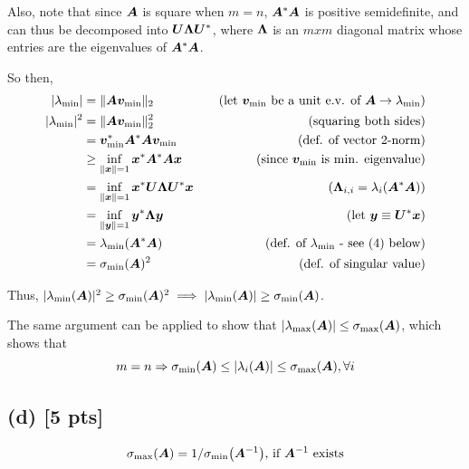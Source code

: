 \documentclass[twoside,10pt]{article}
\begin{document}
  Also, note that since $\bm{A}$ is square when $m = n$, $\bm{A}^{*}\bm{A}$ is positive semidefinite, and can thus be decomposed into $\bm{U}\bm{\Lambda}\bm{U}^{*}$, where $\bm{\Lambda}$ is an $mxm$ diagonal matrix whose entries are the eigenvalues of $\bm{A}^{*}\bm{A}$.

  So then,
  \begin{align*}
    |\lambda_{\mathrm{min}}| &= \|\bm{A}\bm{v}_{\mathrm{min}}\|_2&\quad\text{(let $\bm{v}_{\mathrm{min}}$ be a unit e.v. of $\bm{A} \to \lambda_{\mathrm{min}}$)}\\
    |\lambda_{\mathrm{min}}|^2 &= \|\bm{A}\bm{v}_{\mathrm{min}}\|_2^2&\quad\text{(squaring both sides)}\\
    &= \bm{v}_{\mathrm{min}}^{*}\bm{A}^{*}\bm{A}\bm{v}_{\mathrm{min}}&\quad\text{(def. of vector 2-norm)}\\
    &\geq \inf_{\|\bm{x}\| = 1}{\bm{x}^{*}\bm{A}^{*}\bm{A}\bm{x}}&\quad\text{(since $\bm{v}_{\mathrm{min}}$ is min. eigenvalue)}\\
    &= \inf_{\|\bm{x}\| = 1}{\bm{x}^{*}\bm{U}\bm{\Lambda}\bm{U}^{*}\bm{x}}&\quad\text{($\bm{\Lambda}_{i,i} = \lambda_i(\bm{A}^{*}\bm{A})$)}\\
    &= \inf_{\|\bm{y}\| = 1}{\bm{y}^{*}\bm{\Lambda}\bm{y}}&\quad\text{(let $\bm{y} \equiv \bm{U}^{*}\bm{x}$)}\\
    &= \lambda_{\mathrm{min}}(\bm{A}^{*}\bm{A})&\quad\text{(def. of $\lambda_{\mathrm{min}}$ - see (4) below)}\\
    &= \sigma_{\mathrm{min}}(\bm{A})^2&\quad\text{(def. of singular value)}\\
  \end{align*}

  Thus, $|\lambda_{\mathrm{min}}(\bm{A})|^2 \geq \sigma_{\mathrm{min}}(\bm{A})^2 \implies |\lambda_{\mathrm{min}}(\bm{A})| \geq \sigma_{\mathrm{min}}(\bm{A})$.

  The same argument can be applied to show that $|\lambda_{\mathrm{max}}(\bm{A})| \leq \sigma_{\mathrm{max}}(\bm{A})$, which shows that
  \begin{equation*}
    m = n \Rightarrow \sigma_{\mathrm{min}}(\mtx{A}) \leq \left|\lambda_{i}\left(\mtx{A}\right)\right| \leq \sigma_{\mathrm{max}}\left(\mtx{A}\right), \forall i 
  \end{equation*}

\subsection*{(d) [5 pts]}
  \begin{equation*}
    \sigma_{\mathrm{max}}\left(\mtx{A}\right) = 1 / \sigma_{\mathrm{min}}\left(\mtx{A}^{-1}\right)\text{, if $\mtx{A}^{-1}$ exists}
  \end{equation*}
\end{document}
